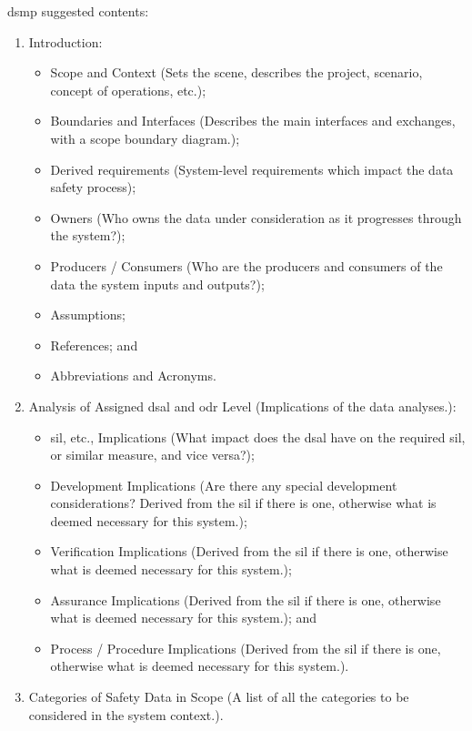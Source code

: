 \Gls{dsmp} suggested contents:
\begin{enumerate}
  \item Introduction:
  \begin{itemize}
    \item Scope and Context (Sets the scene, describes the project, scenario, concept of operations, etc.);
    \item Boundaries and Interfaces (Describes the main interfaces and exchanges, with a scope boundary diagram.);
    \item
      Derived requirements (System-level requirements which impact the data safety process);
    \item {}Owners (Who owns the data under consideration as it progresses through the system?);
    \item Producers / Consumers (Who are the producers and consumers of the data the system inputs and outputs?);
    \item Assumptions;
    \item References; and
    \item Abbreviations and Acronyms.
  \end{itemize}
  \item Analysis of Assigned \gls{dsal} and \gls{odr} Level (Implications of the data analyses.):
  \begin{itemize}
    \item \Gls{sil}, etc., Implications (What impact does the \gls{dsal} have on the required \gls{sil}, or similar measure, and vice versa?);
    \item Development Implications (Are there any special development considerations? Derived from the \gls{sil} if there is one, otherwise what is deemed necessary for this system.);
    \item Verification Implications (Derived from the \gls{sil} if there is one, otherwise what is deemed necessary for this system.);
    \item Assurance Implications (Derived from the \gls{sil} if there is one, otherwise what is deemed necessary for this system.); and
    \item Process / Procedure Implications (Derived from the \gls{sil} if there is one, otherwise what is deemed necessary for this system.).
  \end{itemize}
\item
  Categories
  of Safety Data in Scope (A list of all the categories to be considered in the system context.).

\end{enumerate}
